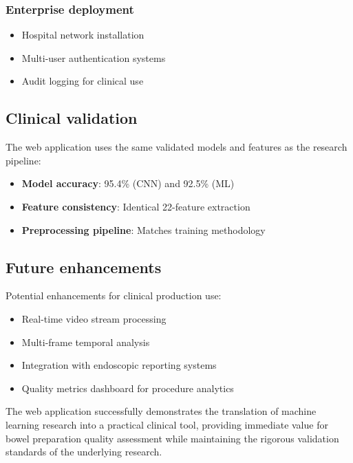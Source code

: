 \documentclass[11pt]{article}
\begin{document}
\subsubsection{Enterprise deployment}
\begin{itemize}
    \item Hospital network installation
    \item Multi-user authentication systems
    \item Audit logging for clinical use
\end{itemize}

\subsection{Clinical validation}

The web application uses the same validated models and features as the research pipeline:

\begin{itemize}
    \item \textbf{Model accuracy}: 95.4\% (CNN) and 92.5\% (ML)
    \item \textbf{Feature consistency}: Identical 22-feature extraction
    \item \textbf{Preprocessing pipeline}: Matches training methodology
\end{itemize}

\subsection{Future enhancements}

Potential enhancements for clinical production use:

\begin{itemize}
    \item Real-time video stream processing
    \item Multi-frame temporal analysis
    \item Integration with endoscopic reporting systems
    \item Quality metrics dashboard for procedure analytics
\end{itemize}

The web application successfully demonstrates the translation of machine learning research into a practical clinical tool, providing immediate value for bowel preparation quality assessment while maintaining the rigorous validation standards of the underlying research.
\end{document}
